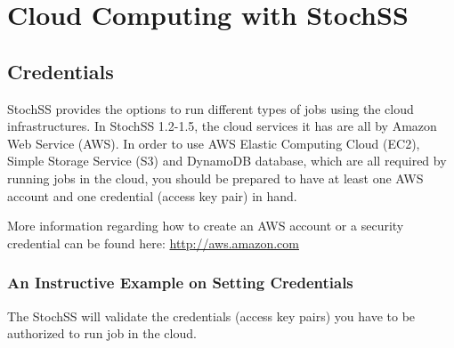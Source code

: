 \chapter{Cloud Computing with StochSS}

%

\section{Credentials}
StochSS provides the options to run different types of jobs using the cloud infrastructures. In StochSS 1.2-1.5, the cloud services it has are all by Amazon Web Service (AWS). In order to use AWS Elastic Computing Cloud (EC2), Simple Storage Service (S3) and DynamoDB database, which are all required by running jobs in the cloud, you should be prepared to have at least one AWS account and one credential (access key pair) in hand. 

More information regarding how to create an AWS account or a security credential can be found here: \url{http://aws.amazon.com}

\subsection{An Instructive Example on Setting Credentials}
The StochSS will validate the credentials (access key pairs) you have to be authorized to run job in the cloud. 


